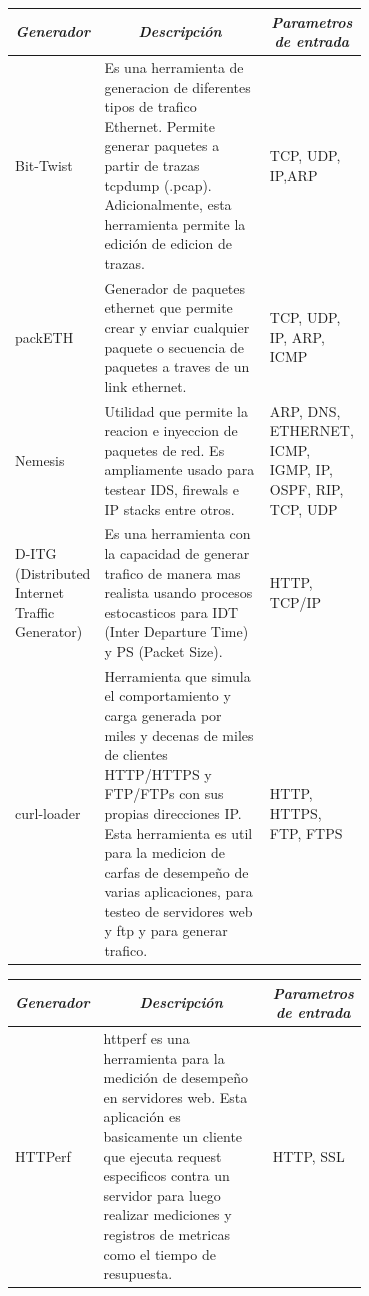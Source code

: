 \documentclass[12pt]{article}
\begin{document}
\begin{table}[htbp]
\centering
\begin{tabular}{|p{0.1\linewidth}|p{0.5\linewidth}|p{0.1\linewidth}|}
\hline
\multicolumn{1}{|c|}{\textit{\textbf{Generador}}} & \multicolumn{1}{c|}{\textit{\textbf{Descripción}}} & \multicolumn{1}{c|}{\textit{\textbf{Parametros de entrada}}} \tabularnewline \hline
Bit-Twist & Es una herramienta de generacion de diferentes tipos de trafico Ethernet. Permite generar paquetes a partir de trazas tcpdump (.pcap). Adicionalmente, esta herramienta permite la edición de edicion de trazas.  
 & TCP, UDP, IP,ARP \tabularnewline \hline
packETH & Generador de paquetes ethernet que permite crear y enviar cualquier paquete o secuencia de paquetes a traves de un link ethernet.  
 & TCP, UDP, IP, ARP, ICMP \tabularnewline \hline
Nemesis & Utilidad que permite la reacion e inyeccion de paquetes de red. Es ampliamente usado para testear IDS, firewals e IP stacks entre otros.  
 & ARP, DNS, ETHERNET, ICMP, IGMP, IP, OSPF, RIP, TCP, UDP \tabularnewline \hline
D-ITG (Distributed Internet Traffic Generator) & Es una herramienta con la capacidad de generar trafico de manera mas realista usando procesos estocasticos para IDT (Inter Departure Time) y PS (Packet Size).  
 & HTTP, TCP/IP \tabularnewline \hline
curl-loader & Herramienta que simula el comportamiento y carga generada  por miles y decenas de miles de clientes HTTP/HTTPS y FTP/FTPs con sus propias direcciones IP. Esta herramienta es util para la medicion de carfas de desempeño de varias aplicaciones, para testeo de servidores web y ftp y para generar trafico. & HTTP, HTTPS, FTP, FTPS\tabularnewline \hline

\end{tabular}
\end{table}


\begin{table}[htbp]
\centering
\begin{tabular}{|p{0.1\linewidth}|p{0.5\linewidth}|p{0.1\linewidth}|}
\hline
\multicolumn{1}{|c|}{\textit{\textbf{Generador}}} & \multicolumn{1}{c|}{\textit{\textbf{Descripción}}} & \multicolumn{1}{c|}{\textit{\textbf{Parametros de entrada}}} \tabularnewline \hline
HTTPerf & httperf es una herramienta para la medición de desempeño en servidores web. Esta aplicación es basicamente un cliente que ejecuta request especificos contra un servidor para luego realizar mediciones y registros de metricas como el tiempo de resupuesta. & HTTP, SSL \tabularnewline \hline
\end{tabular}
\end{table}
\end{document}
